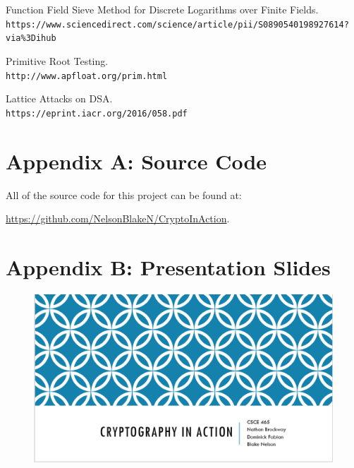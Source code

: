 \documentclass[12pt]{report}
\begin{document}
\begin{thebibliography}{9}
    Function Field Sieve Method for Discrete Logarithms over Finite Fields.\\
    \texttt{https://www.sciencedirect.com/science/article/pii/S0890540198927614?via\%3Dihub}

    Primitive Root Testing.\\
    \texttt{http://www.apfloat.org/prim.html}

    Lattice Attacks on DSA. \\
    \texttt{https://eprint.iacr.org/2016/058.pdf}

\end{thebibliography}

\newpage
\section{Appendix A: Source Code}
All of the source code for this project can be found at:

\href{https://github.com/NelsonBlakeN/CryptoInAction}{https://github.com/NelsonBlakeN/CryptoInAction}.

\section{Appendix B: Presentation Slides}

\begin{figure}[hp!] %
    \begin{center}
        \includegraphics[width=0.85\linewidth]{slide1.PNG}
        \label{fig:slide1}
    \end{center}
\end{figure}
\end{document}
